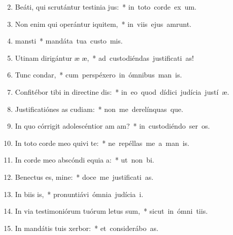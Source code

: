\begin{flushleft}
\begin{enumerate}[leftmargin=*]
\setcounter{enumi}{1}

\item Beáti, qui scrutántur testinia jus:~* \mbox{in toto corde ex um.}
\item Non enim qui operántur iquitem,~* \mbox{in viis ejus amrunt.}
\item {} mansti~* \mbox{mandáta tua custo mis.}
\item Utinam dirigántur æ æ,~* \mbox{ad custodiéndas justificati as!}
\item Tunc  condar,~* \mbox{cum perspéxero in ómnibus man is.}
\item Confitébor tibi in directine dis:~* \mbox{in eo quod dídici judícia justí æ.}
\item Justificatiónes as cudiam:~* \mbox{non me derelínquas que.}
\item In quo córrigit adolescéntior am am?~* \mbox{in custodiéndo ser os.}
\item In toto corde meo quivi te:~* \mbox{ne repéllas me a man is.}
\item In corde meo abscóndi equia a:~* \mbox{ut non  bi.}
\item Benectus es, mine:~* \mbox{doce me justificati as.}
\item In biis is,~* \mbox{pronuntiávi ómnia judícia  i.}
\item In via testimoniórum tuórum letus sum,~* \mbox{sicut in ómni tiis.}
\item In mandátis tuis xerbor:~* \mbox{et considerábo  as.}

\end{enumerate}
\end{flushleft}
